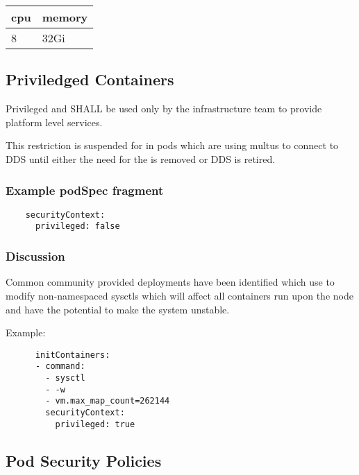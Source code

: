\documentclass[PMO,authoryear,toc]{lsstdoc}
\begin{document}
\begin{center}
\begin{tabular}{|l|l|}
\hline
    \bf cpu & \bf memory \\ \hline
    8 & 32Gi \\ \hline
\end{tabular}
\end{center}

\subsection{Priviledged Containers}

Privileged  and  SHALL be used only by the infrastructure team to provide platform level services.

This restriction is suspended for  in pods which are using multus to connect to DDS until either the need for the  is removed or DDS is retired.

\subsubsection{Example podSpec fragment}

\begin{verbatim}
    securityContext:
      privileged: false
\end{verbatim}

\subsubsection{Discussion}

Common community provided deployments have been identified which use  to modify non-namespaced sysctls which will affect all containers run upon the node and have the potential to make the system unstable.

Example:

\begin{verbatim}
      initContainers:
      - command:
        - sysctl
        - -w
        - vm.max_map_count=262144
        securityContext:
          privileged: true
\end{verbatim}

\subsection{Pod Security Policies}
\end{document}
